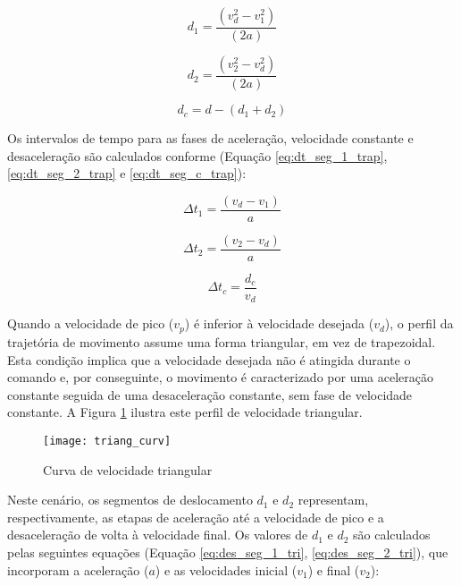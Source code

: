 \begin{equation}
    \label{eq:des_seg_1_trap}
    d_1 = \frac{(v_d^2-v_1^2)}{(2 a)}
\end{equation}

\begin{equation}
    \label{eq:des_seg_2_trap}
    d_2 = \frac{(v_2^2-v_d^2)}{(2 a)}
\end{equation}

\begin{equation}
    \label{eq:des_seg_c_trap}
    d_c = d-(d_1+d_2)
\end{equation}

Os intervalos de tempo para as fases de aceleração, velocidade constante e desaceleração são calculados conforme (Equação \ref{eq:dt_seg_1_trap},  \ref{eq:dt_seg_2_trap} e  \ref{eq:dt_seg_c_trap}):

\begin{equation}
    \label{eq:dt_seg_1_trap}
    \Delta t_1 = \frac{(v_d-v_1)}{a}
\end{equation}

\begin{equation}
    \label{eq:dt_seg_2_trap}
    \Delta t_2 = \frac{(v_2-v_d)}{a}
\end{equation}

\begin{equation}
    \label{eq:dt_seg_c_trap}
    \Delta t_c = \frac{d_c}{v_d}
\end{equation}

Quando a velocidade de pico (\(v_p\)) é inferior à velocidade desejada (\(v_d\)), o perfil da trajetória de movimento assume uma forma triangular, em vez de trapezoidal. Esta condição implica que a velocidade desejada não é atingida durante o comando e, por conseguinte, o movimento é caracterizado por uma aceleração constante seguida de uma desaceleração constante, sem fase de velocidade constante. A Figura \ref{fig:triang_curv} ilustra este perfil de velocidade triangular.

\begin{figure}[H]
    \centering
    \caption{Curva de velocidade triangular}
    \texttt{[image: triang\_curv]}

    \label{fig:triang_curv}
\end{figure}

Neste cenário, os segmentos de deslocamento \(d_1\) e \(d_2\) representam, respectivamente, as etapas de aceleração até a velocidade de pico e a desaceleração de volta à velocidade final. Os valores de \(d_1\) e \(d_2\) são calculados pelas seguintes equações (Equação \ref{eq:des_seg_1_tri}, \ref{eq:des_seg_2_tri}), que incorporam a aceleração (\(a\)) e as velocidades inicial (\(v_1\)) e final (\(v_2\)):


